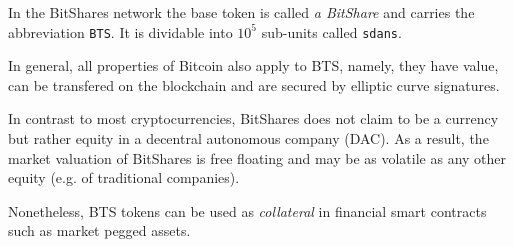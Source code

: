 In the BitShares network the base token is called \emph{a BitShare} and carries
the abbreviation \texttt{BTS}. It is dividable into $10^5$ sub-units called
\texttt{sdans}. %

In general, all properties of Bitcoin also apply to BTS, namely, they have
value, can be transfered on the blockchain and are secured by elliptic curve
signatures.

In contrast to most cryptocurrencies, BitShares does not claim to be a currency
but rather equity in a decentral autonomous company (DAC). As a result, the
market valuation of BitShares is free floating and may be as volatile as any
other equity (e.g. of traditional companies).

Nonetheless, BTS tokens can be used as \emph{collateral} in financial smart
contracts~\cite{bts:financial} such as market pegged assets.

